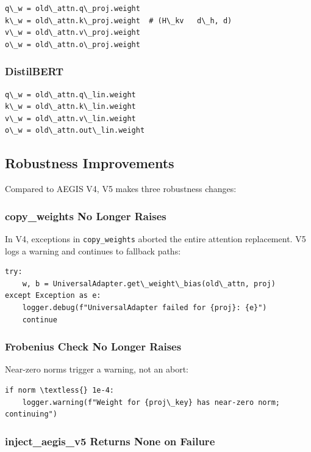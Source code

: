 \begin{lstlisting}
q\_w = old\_attn.q\_proj.weight
k\_w = old\_attn.k\_proj.weight  # (H\_kv   d\_h, d)
v\_w = old\_attn.v\_proj.weight
o\_w = old\_attn.o\_proj.weight
\end{lstlisting}

\subsubsection{DistilBERT}

\begin{lstlisting}
q\_w = old\_attn.q\_lin.weight
k\_w = old\_attn.k\_lin.weight
v\_w = old\_attn.v\_lin.weight
o\_w = old\_attn.out\_lin.weight
\end{lstlisting}

\subsection{Robustness Improvements}

Compared to AEGIS V4, V5 makes three robustness changes:

\subsubsection{copy\_weights No Longer Raises}

In V4, exceptions in \texttt{copy\_weights} aborted the entire attention replacement. 
V5 logs a warning and continues to fallback paths:

\begin{lstlisting}
try:
    w, b = UniversalAdapter.get\_weight\_bias(old\_attn, proj)
except Exception as e:
    logger.debug(f"UniversalAdapter failed for {proj}: {e}")
    continue
\end{lstlisting}

\subsubsection{Frobenius Check No Longer Raises}

Near-zero norms trigger a warning, not an abort:

\begin{lstlisting}
if norm \textless{} 1e-4:
    logger.warning(f"Weight for {proj\_key} has near-zero norm; continuing")
\end{lstlisting}

\subsubsection{inject\_aegis\_v5 Returns None on Failure}

